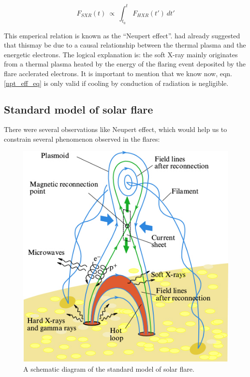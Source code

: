 \begin{equation}\label{npt_eff_eq}
    F_{SXR}(t)~\propto~\int_{t_{0}}^{t}~F_{HXR}(t')~dt'
\end{equation}

This emperical relation is known as the ``Neupert effect''. \cite{neupert68} had already suggested that thismay be due to a causal relationship between the thermal plasma and the energetic electrons. The logical explanation is: the soft X-ray mainly originates from a thermal plasma heated by the energy of the flaring event deposited by the flare acclerated electrons. It is important to mention that we know now, eqn.\ref{npt_eff_eq} is only valid if cooling by conduction of radiation is negligible.

\subsection{Standard model of solar flare}\label{sol_flr_std_mod}

There were several observations like Neupert effect, which would help us to constrain several phenomenon observed in the flares:

\begin{figure}[h!]
    \centering
    \includegraphics[width=0.5\linewidth]{Figures/phu_63_8_818_f2.jpg}
    \caption{A schematic diagram of the standard model of solar flare.}
\end{figure}

